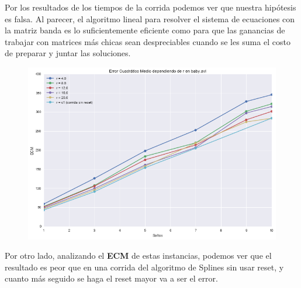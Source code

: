 Por los resultados de los tiempos de la corrida podemos ver que nuestra
hip\'otesis es falsa. Al parecer, el algoritmo lineal para resolver el sistema
de ecuaciones con la matriz banda es lo suficientemente eficiente como para que
las ganancias de trabajar con matrices m\'as chicas sean despreciables cuando se
les suma el costo de preparar y juntar las soluciones.

\begin{figure}[H]
\centering
\includegraphics[width=.95\textwidth]{graficos/ecm_reset.png}
\end{figure}

Por otro lado, analizando el \textbf{ECM} de estas instancias, podemos ver que
el resultado es peor que en una corrida del algoritmo de Splines sin usar reset,
y cuanto m\'as seguido se haga el reset mayor va a ser el error.

